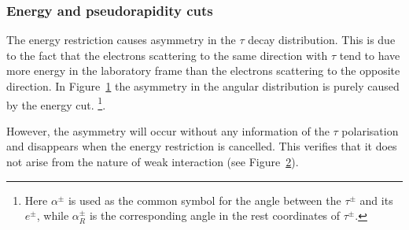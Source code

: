 \documentclass[a4paper,12pt,titlepage]{article}
\begin{document}
\subsubsection{Energy and pseudorapidity cuts}
The energy restriction causes asymmetry in the $\tau$ decay distribution. This is due to the fact that the electrons scattering to the same direction with $\tau$ tend to have more energy in the laboratory frame than the electrons scattering to the opposite direction. In Figure~\ref{fig:cosrestSNS1} the asymmetry in the angular distribution is purely caused by the energy cut. \footnote[2]{Here $\alpha^{\pm}$ is used as the common symbol for the angle between the $\tau^{\pm}$ and its $e^{\pm}$, while $\alpha_R^{\pm}$ is the corresponding angle in the rest coordinates of $\tau^{\pm}$.}. 

However, the asymmetry will occur without any information of the $\tau$ polarisation and disappears when the energy restriction is cancelled. This verifies that it does not arise from the nature of weak interaction (see Figure~\ref{fig:cosrestNS1}). 


\begin{figure}[htbp]
  \begin{center}
    \leavevmode
    

\label{fig:cosrestSNS1}

\end{center}
\end{figure}

\begin{figure}[htbp]
  \begin{center}
    \leavevmode
  
  
  \label{fig:cosrestNS1}
  
\end{center}
\end{figure}
\end{document}
